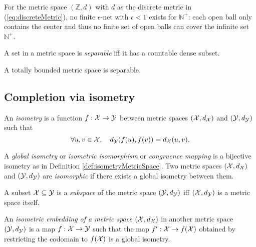 \begin{exm}
  For the metric space $(\mathbb{Z},d)$
  with $d$ as the discrete metric in (\ref{eq:discreteMetric}),
  no finite $\epsilon$-net with $\epsilon<1$
  exists for $\mathbb{N}^+$:
  each open ball only contains the center
  and thus no finite set of open balls
  can cover the infinite set $\mathbb{N}^+$.
\end{exm}

\begin{defn}
  \label{def:separableMetricSpace}
  A set in a metric space is \emph{separable}
  iff it has a countable dense subset.
\end{defn}

\begin{lem}
  A totally bounded metric space is separable.
\end{lem}

\subsection{Completion via isometry}
\label{sec:compl-via-isom}

\begin{defn}
  \label{def:isometryMetricSpace}
  An \emph{isometry} is a function $f: {\cal X}\rightarrow{\cal Y}$
  between metric spaces $({\cal X}, d_{{\cal X}})$
  and $({\cal Y}, d_{{\cal Y}})$
  such that
  \begin{equation}
    \label{eq:isometryMetricSpace}
    \forall u,v\in {\cal X},\quad
    d_{{\cal Y}}(f(u),f(v)) = d_{{\cal X}}(u,v).
  \end{equation}
\end{defn}

\begin{defn}
  \label{def:isometricIsomorphism}
  A \emph{global isometry} or \emph{isometric isomorphism}
  or \emph{congruence mapping}
  is a bijective isometry
  as in Definition \ref{def:isometryMetricSpace}.
  Two metric spaces $({\cal X}, d_{{\cal X}})$
  and $({\cal Y}, d_{{\cal Y}})$
  are \emph{isomorphic} if there exists
  a global isometry between them.
\end{defn}

\begin{defn}
  \label{def:subspaceMetric}
  A subset ${\cal X}\subseteq {\cal Y}$
  is a \emph{subspace} of the metric space
  $({\cal Y}, d_{{\cal Y}})$ iff
  $({\cal X}, d_{{\cal Y}})$ is a metric space itself.
\end{defn}

\begin{defn}
  \label{def:isometricEmbedding}
  An \emph{isometric embedding of
  a metric space} $({\cal X}, d_{{\cal X}})$
  in another metric space
  $({\cal Y}, d_{{\cal Y}})$
  is a map $f: {\cal X}\rightarrow {\cal Y}$
  such that the map $f': {\cal X}\rightarrow f({\cal X})$
  obtained by restricting the codomain to $f({\cal X})$
  is a global isometry.
\end{defn}

